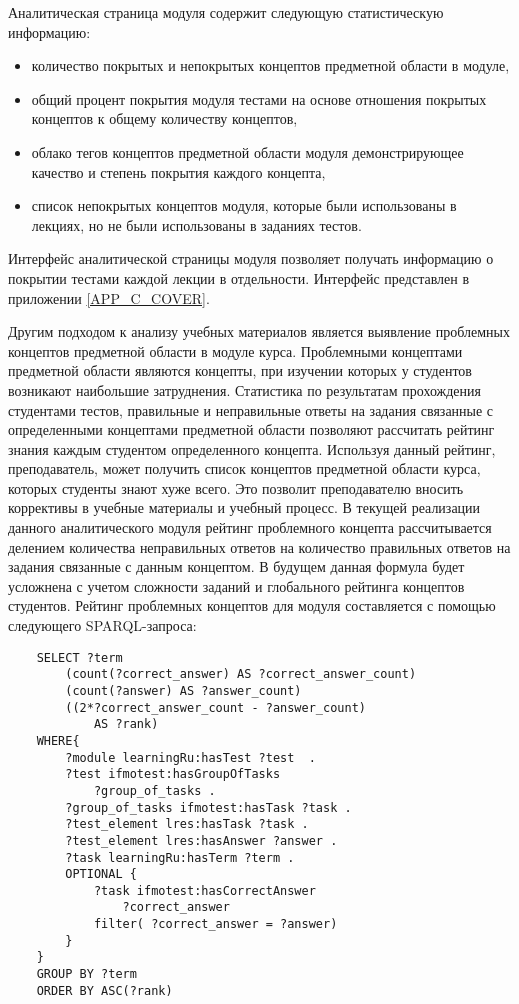Аналитическая страница модуля содержит следующую статистическую информацию:

\begin{itemize}
\item количество покрытых и непокрытых концептов предметной области в модуле,
\item общий процент покрытия модуля тестами на основе отношения покрытых концептов к общему количеству концептов,
\item облако тегов концептов предметной области модуля демонстрирующее качество и степень покрытия каждого концепта,
\item список непокрытых концептов модуля, которые были использованы в лекциях, но не были использованы в заданиях тестов.   
\end{itemize}

Интерфейс аналитической страницы модуля позволяет получать информацию о покрытии тестами каждой лекции в отдельности. Интерфейс представлен в приложении \ref{APP_C_COVER}.

Другим подходом к анализу учебных материалов является выявление проблемных  концептов предметной области в модуле курса. Проблемными концептами предметной области являются концепты, при изучении которых у студентов возникают наибольшие затруднения. Статистика по результатам прохождения студентами тестов, правильные и неправильные ответы на задания связанные с определенными концептами предметной области позволяют рассчитать рейтинг знания каждым студентом определенного концепта. Используя данный рейтинг, преподаватель, может получить список концептов предметной области курса, которых студенты знают хуже всего. Это позволит преподавателю вносить коррективы в учебные материалы и учебный процесс. В текущей реализации данного аналитического модуля рейтинг проблемного концепта рассчитывается делением количества неправильных ответов на количество правильных ответов на задания связанные с данным концептом. В будущем данная формула будет усложнена с учетом сложности заданий и глобального рейтинга концептов студентов. Рейтинг проблемных концептов для модуля составляется с помощью следующего  SPARQL-запроса:

\begin{verbatim}
    SELECT ?term 
        (count(?correct_answer) AS ?correct_answer_count)
        (count(?answer) AS ?answer_count)
        ((2*?correct_answer_count - ?answer_count) 
            AS ?rank) 
    WHERE{
        ?module learningRu:hasTest ?test  . 
        ?test ifmotest:hasGroupOfTasks 
            ?group_of_tasks .        
        ?group_of_tasks ifmotest:hasTask ?task .      
        ?test_element lres:hasTask ?task .
        ?test_element lres:hasAnswer ?answer .
        ?task learningRu:hasTerm ?term .       
        OPTIONAL { 
            ?task ifmotest:hasCorrectAnswer 
                ?correct_answer
            filter( ?correct_answer = ?answer)
        }         
    }
    GROUP BY ?term 
    ORDER BY ASC(?rank)
\end{verbatim}

